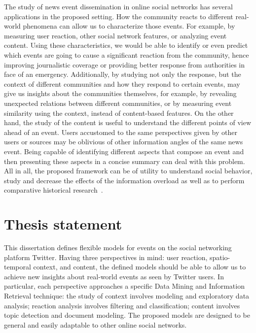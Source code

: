The study of news event dissemination in online social networks has several
applications in the proposed setting. 
%
How the community reacts to different real-world phenomena can allow us to
characterize those events. 
%
For example, by measuring user reaction, other social network features, or
analyzing event content.
%
Using these characteristics, we would be able to identify or even predict which
events are going to cause a significant reaction from the community, hence
improving journalistic coverage or providing better response from authorities in
face of an emergency.
%
Additionally, by studying not only the response, but the context of different
communities and how they respond to certain events, may give us insights about
the communities themselves, for example, by revealing unexpected relations
between different communities, or by measuring event similarity using the
context, instead of content-based features. 
%
On the other hand, the study of the content is useful to understand the
different points of view ahead of an event. 
%
Users accustomed to the same perspectives given by other users or sources may be
oblivious of other information angles of the same news event. 
%
Being capable of identifying different aspects that compose an event and then
presenting these aspects in a concise summary can deal with this problem. 
%
All in all, the proposed framework can be of utility to understand social
behavior, study and decrease the effects of the information overload as well
as to perform comparative historical research~\cite{wiki:comparative}.


\section{Thesis statement} 
%
This dissertation defines flexible models for events on the social
networking platform Twitter. 
%
Having three perspectives in mind: user reaction, spatio-temporal context, and
content, the defined models should be able to allow us to achieve new insights
about real-world events as seen by Twitter users. 
%
In particular, each perspective approaches a specific Data Mining and Information
Retrieval technique: 
%
the study of context involves modeling and exploratory data analysis; 
%
reaction analysis involves filtering and classification;
%
content involves topic detection and document modeling.
%
The proposed models are designed to be general and easily adaptable to other
online social networks.

